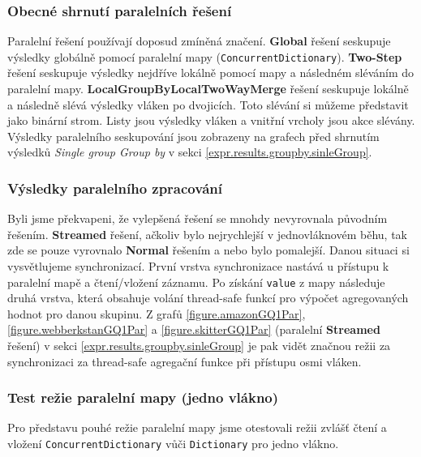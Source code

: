 \subsubsection{Obecné shrnutí paralelních řešení} \label{expr.results.groupby.par}

Paralelní řešení používají doposud zmíněná značení.
\textbf{Global} řešení seskupuje výsledky globálně pomocí paralelní mapy (\verb+ConcurrentDictionary+).
\textbf{Two-Step} řešení seskupuje výsledky nejdříve lokálně pomocí mapy a následném sléváním do paralelní mapy.
\textbf{LocalGroupByLocalTwoWayMerge} řešení seskupuje lokálně a následně slévá výsledky vláken po dvojicích. 
Toto slévání si můžeme představit jako binární strom. 
Listy jsou výsledky vláken a vnitřní vrcholy jsou akce slévány.
Výsledky paralelního seskupování jsou zobrazeny na grafech před shrnutím výsledků \textit{Single group Group by} v sekci \ref{expr.results.groupby.sinleGroup}.

\subsubsection{Výsledky paralelního zpracování}

Byli jsme překvapeni, že vylepšená řešení se mnohdy nevyrovnala původním řešením.
\textbf{Streamed} řešení, ačkoliv bylo nejrychlejší v jednovláknovém běhu, tak zde se pouze vyrovnalo \textbf{Normal} řešením a nebo bylo pomalejší.
Danou situaci si vysvětlujeme synchronizací. 
První vrstva synchronizace nastává u přístupu k paralelní mapě a čtení/vložení záznamu.
Po získání \verb+value+ z mapy následuje druhá vrstva, která obsahuje volání thread-safe funkcí pro výpočet agregovaných hodnot pro danou skupinu.
Z grafů \ref{figure.amazonGQ1Par}, \ref{figure.webberkstanGQ1Par} a \ref{figure.skitterGQ1Par} (paralelní \textbf{Streamed} řešení) v sekci \ref{expr.results.groupby.sinleGroup} je pak vidět značnou režii za synchronizaci za thread-safe agregační funkce při přístupu osmi vláken.

\subsubsection{Test režie paralelní mapy (jedno vlákno)}

Pro představu pouhé režie paralelní mapy jsme otestovali režii zvlášť čtení a vložení \verb+ConcurrentDictionary+ vůči \verb+Dictionary+ pro jedno vlákno.

